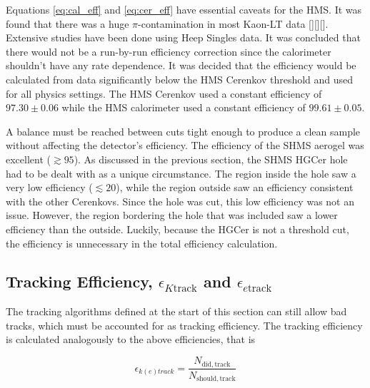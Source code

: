 \documentclass[
]{report}
\begin{document}


Equations \ref{eq:cal_eff} and \ref{eq:cer_eff} have essential caveats
for the HMS. It was found that there was a huge \(\pi\)-contamination in
most Kaon-LT data
{[}\cite{usman_kaonlt_2023}{]}{[}\cite{usman_hms_2023}{]}{[}\cite{usman_hms_2023-1}{]}.
Extensive studies have been done using Heep Singles data. It was
concluded that there would not be a run-by-run efficiency correction
since the calorimeter shouldn't have any rate dependence. It was decided
that the efficiency would be calculated from data significantly below
the HMS Cerenkov threshold and used for all physics settings. The HMS
Cerenkov used a constant efficiency of \(97.30\pm 0.06%
\) while the HMS calorimeter used a constant efficiency of
\(99.61\pm0.05%
\).

A balance must be reached between cuts tight enough to produce a clean
sample without affecting the detector's efficiency. The efficiency of
the SHMS aerogel was excellent (\(\gtrsim95%
\)). As discussed in the previous section, the SHMS HGCer hole had to be
dealt with as a unique circumstance. The region inside the hole saw a
very low efficiency (\(\lesssim20%
\)), while the region outside saw an efficiency consistent with the
other Cerenkovs. Since the hole was cut, this low efficiency was not an
issue. However, the region bordering the hole that was included saw a
lower efficiency than the outside. Luckily, because the HGCer is not a
threshold cut, the efficiency is unnecessary in the total efficiency
calculation.

\hypertarget{tracking-efficiency-epsilon_kmathrmtrack-and-epsilon_emathrmtrack}{%
\subsection{\texorpdfstring{Tracking Efficiency,
\(\epsilon_{K\mathrm{track}}\) and
\(\epsilon_{e\mathrm{track}}\)}{Tracking Efficiency, \textbackslash epsilon\_\{K\textbackslash mathrm\{track\}\} and \textbackslash epsilon\_\{e\textbackslash mathrm\{track\}\}}}\label{tracking-efficiency-epsilon_kmathrmtrack-and-epsilon_emathrmtrack}}

The tracking algorithms defined at the start of this section can still
allow bad tracks, which must be accounted for as tracking efficiency.
The tracking efficiency is calculated analogously to the above
efficiencies, that is

\begin{equation} 
  \epsilon_{k(e)track}=\frac{N_{\mathrm{did,track}}}{N_{\mathrm{should,track}}}
  \label{eq:track_eff} 
\end{equation}
\end{document}
